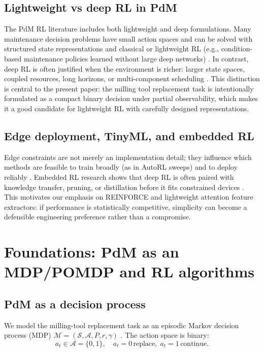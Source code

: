 \documentclass[11pt]{article}
\begin{document}
\subsection{Lightweight vs deep RL in PdM}
The PdM RL literature includes both lightweight and deep formulations. Many maintenance decision problems have small action spaces and can be solved with structured state representations and classical or lightweight RL (e.g., condition-based maintenance policies learned without large deep networks) \parencite{Adsule2020CBMRL, Yousefi2020QualityEngineering}. In contrast, deep RL is often justified when the environment is richer: larger state spaces, coupled resources, long horizons, or multi-component scheduling \parencite{Liu2020EJOR, LeeMitici2022RESS, Chen2023IISE, Ong2022TransferDRL}. This distinction is central to the present paper: the milling tool replacement task is intentionally formulated as a compact binary decision under partial observability, which makes it a good candidate for lightweight RL with carefully designed representations.

\subsection{Edge deployment, TinyML, and embedded RL}
Edge constraints are not merely an implementation detail; they influence which methods are feasible to train broadly (as in AutoRL sweeps) and to deploy reliably \parencite{Compare2020IoT, Njor2024TinyML, Pandey2023EdgeDNN}. Embedded RL research shows that deep RL is often paired with knowledge transfer, pruning, or distillation before it fits constrained devices \parencite{Jang2020KnowledgeTransfer, Szydlo2022TinyRL, Xu2022ISORC}. This motivates our emphasis on REINFORCE and lightweight attention feature extractors: if performance is statistically competitive, simplicity can become a defensible engineering preference rather than a compromise.

\section{Foundations: PdM as an MDP/POMDP and RL algorithms}
\label{sec:foundations}
\subsection{PdM as a decision process}
We model the milling-tool replacement task as an episodic Markov decision process (MDP) $\mathcal{M}=(\mathcal{S},\mathcal{A},P,r,\gamma)$ \parencite{SuttonBarto2018}. The action space is binary:
\begin{equation}
	a_t \in \mathcal{A}=\{0,1\}, \quad a_t=0\,\text{replace}, \; a_t=1\,\text{continue}.
\end{equation}
\end{document}

